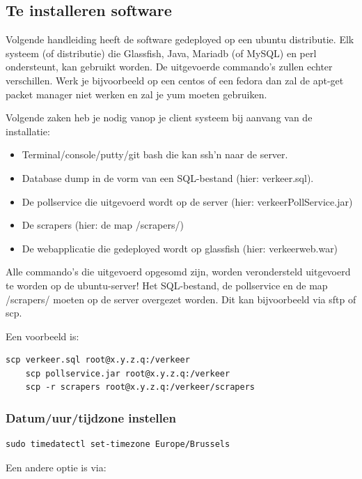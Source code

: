 \subsection{Te installeren software}

Volgende handleiding heeft de software gedeployed op een ubuntu distributie. Elk systeem (of distributie) die Glassfish, Java, Mariadb (of MySQL) en perl ondersteunt, kan gebruikt worden. De uitgevoerde commando's zullen echter verschillen. Werk je bijvoorbeeld op een centos of een fedora dan zal de apt-get packet manager niet werken en zal je yum moeten gebruiken.

Volgende zaken heb je nodig vanop je client systeem bij aanvang van de installatie:

\begin{itemize}
\item Terminal/console/putty/git bash die kan ssh'n naar de server.
\item Database dump in de vorm van een SQL-bestand (hier: verkeer.sql).
\item De pollservice die uitgevoerd wordt op de server (hier: verkeerPollService.jar)
\item De scrapers (hier: de map /scrapers/)
\item De webapplicatie die gedeployed wordt op glassfish (hier: verkeerweb.war)
\end{itemize}

Alle commando's die uitgevoerd opgesomd zijn, worden verondersteld uitgevoerd te worden op de ubuntu-server! Het SQL-bestand, de pollservice en de map /scrapers/ moeten op de server overgezet worden. Dit kan bijvoorbeeld via sftp of scp.

Een voorbeeld is:

\begin{lstlisting}[style=BashInputStyle]
	scp verkeer.sql root@x.y.z.q:/verkeer
	scp pollservice.jar root@x.y.z.q:/verkeer
	scp -r scrapers root@x.y.z.q:/verkeer/scrapers
\end{lstlisting}

\subsubsection{Datum/uur/tijdzone instellen}

\begin{lstlisting}[style=BashInputStyle]
	sudo timedatectl set-timezone Europe/Brussels
\end{lstlisting}

Een andere optie is via:

